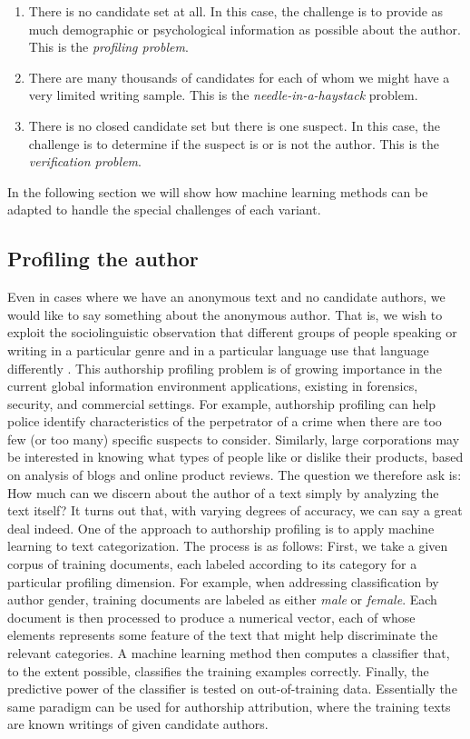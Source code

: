 \begin{enumerate}
	\item There is no candidate set at all. In this case, the challenge is to provide as much demographic or psychological information as possible about the author. This is the \textit{profiling problem}.
	\item There are many thousands of candidates for each of whom we might have a very limited writing sample. This is the \textit{needle-in-a-haystack} problem.
	\item There is no closed candidate set but there is one suspect. In this case, the challenge is to determine if the suspect is or is not the author. This is the \textit{verification problem}.
\end{enumerate}

In the following section we will show how machine learning methods can be adapted to handle the special challenges of each variant.

\subsection{Profiling the author}
Even in cases where we have an anonymous text and no candidate authors, we would like to say something about the anonymous author. That is, we wish to exploit the sociolinguistic observation that different groups of people speaking or writing in a particular genre and in a particular language use that language differently \cite{chambers2004handbook}.
This authorship profiling problem is of growing importance in the current global information environment applications, existing in forensics, security, and commercial settings. For example, authorship profiling can help police identify characteristics of the perpetrator of a crime when there are too few (or too many) specific suspects to consider. Similarly, large corporations may be interested in knowing what types of people like or dislike their products, based on analysis of blogs and online product reviews. The question we therefore ask is: How much can we discern about the author of a text simply by analyzing the text itself? It turns out that, with varying degrees of accuracy, we can say a great deal indeed.
One of the approach to authorship profiling is to apply machine learning to text categorization. The process is as follows: First, we take a given corpus of training documents, each labeled according to its category for a particular profiling dimension. For example, when addressing classification by author gender, training documents are labeled as either \textit{male} or \textit{female}. Each document is then processed to produce a numerical vector, each of whose elements represents some feature of the text that might help discriminate the relevant categories. A machine learning method then computes a classifier that, to the extent possible, classifies the training examples correctly. Finally, the predictive power of the classifier is tested on out-of-training data.
Essentially the same paradigm can be used for authorship attribution, where the training texts are known writings of given candidate authors.\cite{juola2008authorship}

